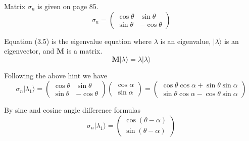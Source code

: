 


\bigskip
Matrix $\sigma_n$ is given on page 85.
\begin{equation*}
\sigma_n=\begin{pmatrix}
\cos\theta & \sin\theta
\\
\sin\theta & -\cos\theta
\end{pmatrix}
\end{equation*}

Equation (3.5) is the eigenvalue equation where $\lambda$ is an eigenvalue,
$|\lambda\rangle$ is an eigenvector, and $\mathbf M$ is a matrix.
\begin{equation*}
\mathbf M|\lambda\rangle=\lambda|\lambda\rangle
\tag{3.5}
\end{equation*}

Following the above hint we have
\begin{equation*}
\sigma_n|\lambda_1\rangle=\begin{pmatrix}
\cos\theta & \sin\theta
\\
\sin\theta & -\cos\theta
\end{pmatrix}
\begin{pmatrix}\cos\alpha\\\sin\alpha\end{pmatrix}
=\begin{pmatrix}
\cos\theta\cos\alpha+\sin\theta\sin\alpha
\\
\sin\theta\cos\alpha-\cos\theta\sin\alpha
\end{pmatrix}
\end{equation*}

By sine and cosine angle difference formulas
\begin{equation*}
\sigma_n|\lambda_1\rangle
=\begin{pmatrix}
\cos(\theta-\alpha)
\\
\sin(\theta-\alpha)
\end{pmatrix}
\end{equation*}

